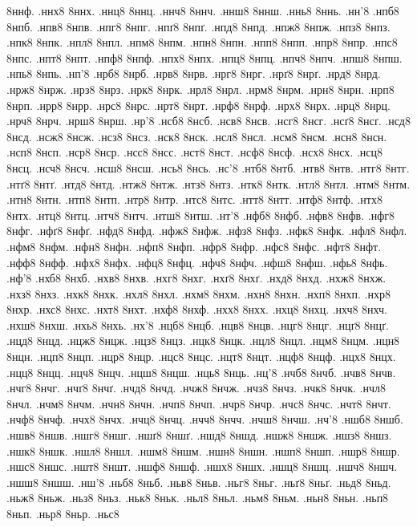 {8ннф.
.ннх8
8ннх.
.ннц8
8ннц.
.ннч8
8ннч.
.ннш8
8ннш.
.ннь8
8ннь.
.нн'8
.нпб8
8нпб.
.нпв8
8нпв.
.нпг8
8нпг.
.нпґ8
8нпґ.
.нпд8
8нпд.
.нпж8
8нпж.
.нпз8
8нпз.
.нпк8
8нпк.
.нпл8
8нпл.
.нпм8
8нпм.
.нпн8
8нпн.
.нпп8
8нпп.
.нпр8
8нпр.
.нпс8
8нпс.
.нпт8
8нпт.
.нпф8
8нпф.
.нпх8
8нпх.
.нпц8
8нпц.
.нпч8
8нпч.
.нпш8
8нпш.
.нпь8
8нпь.
.нп'8
.нрб8
8нрб.
.нрв8
8нрв.
.нрг8
8нрг.
.нрґ8
8нрґ.
.нрд8
8нрд.
.нрж8
8нрж.
.нрз8
8нрз.
.нрк8
8нрк.
.нрл8
8нрл.
.нрм8
8нрм.
.нрн8
8нрн.
.нрп8
8нрп.
.нрр8
8нрр.
.нрс8
8нрс.
.нрт8
8нрт.
.нрф8
8нрф.
.нрх8
8нрх.
.нрц8
8нрц.
.нрч8
8нрч.
.нрш8
8нрш.
.нр'8
.нсб8
8нсб.
.нсв8
8нсв.
.нсг8
8нсг.
.нсґ8
8нсґ.
.нсд8
8нсд.
.нсж8
8нсж.
.нсз8
8нсз.
.нск8
8нск.
.нсл8
8нсл.
.нсм8
8нсм.
.нсн8
8нсн.
.нсп8
8нсп.
.нср8
8нср.
.нсс8
8нсс.
.нст8
8нст.
.нсф8
8нсф.
.нсх8
8нсх.
.нсц8
8нсц.
.нсч8
8нсч.
.нсш8
8нсш.
.нсь8
8нсь.
.нс'8
.нтб8
8нтб.
.нтв8
8нтв.
.нтг8
8нтг.
.нтґ8
8нтґ.
.нтд8
8нтд.
.нтж8
8нтж.
.нтз8
8нтз.
.нтк8
8нтк.
.нтл8
8нтл.
.нтм8
8нтм.
.нтн8
8нтн.
.нтп8
8нтп.
.нтр8
8нтр.
.нтс8
8нтс.
.нтт8
8нтт.
.нтф8
8нтф.
.нтх8
8нтх.
.нтц8
8нтц.
.нтч8
8нтч.
.нтш8
8нтш.
.нт'8
.нфб8
8нфб.
.нфв8
8нфв.
.нфг8
8нфг.
.нфґ8
8нфґ.
.нфд8
8нфд.
.нфж8
8нфж.
.нфз8
8нфз.
.нфк8
8нфк.
.нфл8
8нфл.
.нфм8
8нфм.
.нфн8
8нфн.
.нфп8
8нфп.
.нфр8
8нфр.
.нфс8
8нфс.
.нфт8
8нфт.
.нфф8
8нфф.
.нфх8
8нфх.
.нфц8
8нфц.
.нфч8
8нфч.
.нфш8
8нфш.
.нфь8
8нфь.
.нф'8
.нхб8
8нхб.
.нхв8
8нхв.
.нхг8
8нхг.
.нхґ8
8нхґ.
.нхд8
8нхд.
.нхж8
8нхж.
.нхз8
8нхз.
.нхк8
8нхк.
.нхл8
8нхл.
.нхм8
8нхм.
.нхн8
8нхн.
.нхп8
8нхп.
.нхр8
8нхр.
.нхс8
8нхс.
.нхт8
8нхт.
.нхф8
8нхф.
.нхх8
8нхх.
.нхц8
8нхц.
.нхч8
8нхч.
.нхш8
8нхш.
.нхь8
8нхь.
.нх'8
.нцб8
8нцб.
.нцв8
8нцв.
.нцг8
8нцг.
.нцґ8
8нцґ.
.нцд8
8нцд.
.нцж8
8нцж.
.нцз8
8нцз.
.нцк8
8нцк.
.нцл8
8нцл.
.нцм8
8нцм.
.нцн8
8нцн.
.нцп8
8нцп.
.нцр8
8нцр.
.нцс8
8нцс.
.нцт8
8нцт.
.нцф8
8нцф.
.нцх8
8нцх.
.нцц8
8нцц.
.нцч8
8нцч.
.нцш8
8нцш.
.нць8
8нць.
.нц'8
.нчб8
8нчб.
.нчв8
8нчв.
.нчг8
8нчг.
.нчґ8
8нчґ.
.нчд8
8нчд.
.нчж8
8нчж.
.нчз8
8нчз.
.нчк8
8нчк.
.нчл8
8нчл.
.нчм8
8нчм.
.нчн8
8нчн.
.нчп8
8нчп.
.нчр8
8нчр.
.нчс8
8нчс.
.нчт8
8нчт.
.нчф8
8нчф.
.нчх8
8нчх.
.нчц8
8нчц.
.нчч8
8нчч.
.нчш8
8нчш.
.нч'8
.ншб8
8ншб.
.ншв8
8ншв.
.ншг8
8ншг.
.ншґ8
8ншґ.
.ншд8
8ншд.
.ншж8
8ншж.
.ншз8
8ншз.
.ншк8
8ншк.
.ншл8
8ншл.
.ншм8
8ншм.
.ншн8
8ншн.
.ншп8
8ншп.
.ншр8
8ншр.
.ншс8
8ншс.
.ншт8
8ншт.
.ншф8
8ншф.
.ншх8
8ншх.
.ншц8
8ншц.
.ншч8
8ншч.
.ншш8
8ншш.
.нш'8
.ньб8
8ньб.
.ньв8
8ньв.
.ньг8
8ньг.
.ньґ8
8ньґ.
.ньд8
8ньд.
.ньж8
8ньж.
.ньз8
8ньз.
.ньк8
8ньк.
.ньл8
8ньл.
.ньм8
8ньм.
.ньн8
8ньн.
.ньп8
8ньп.
.ньр8
8ньр.
.ньс8
}
